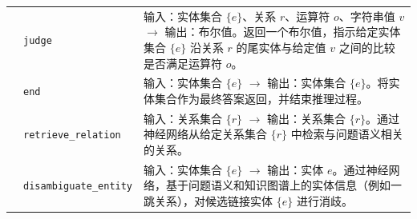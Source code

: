 \documentclass[11pt,UTF8,fontset=fandol]{ctexart}
\begin{document}
\begin{table}[H]
\begin{tabular}{p{1.6cm} p{3.6cm} p{9.5cm}}
\cmidrule(l){2-3}
& \texttt{judge}
& 输入：实体集合 $\{e\}$、关系 $r$、运算符 $o$、字符串值 $v$ $\rightarrow$ 输出：布尔值。返回一个布尔值，指示给定实体集合 $\{e\}$ 沿关系 $r$ 的尾实体与给定值 $v$ 之间的比较是否满足运算符 $o$。 \\
\cmidrule(l){2-3}
& \texttt{end}
& 输入：实体集合 $\{e\}$ $\rightarrow$ 输出：实体集合 $\{e\}$。将实体集合作为最终答案返回，并结束推理过程。 \\
\midrule
{}
& \texttt{retrieve\_relation}
& 输入：关系集合 $\{r\}$ $\rightarrow$ 输出：关系集合 $\{r\}$。通过神经网络从给定关系集合 $\{r\}$ 中检索与问题语义相关的关系。 \\
\cmidrule(l){2-3}
& \texttt{disambiguate\_entity}
& 输入：实体集合 $\{e\}$ $\rightarrow$ 输出：实体 $e$。通过神经网络，基于问题语义和知识图谱上的实体信息（例如一跳关系），对候选链接实体 $\{e\}$ 进行消歧。 \\
\bottomrule
\end{tabular}
\end{table}
\end{document}
